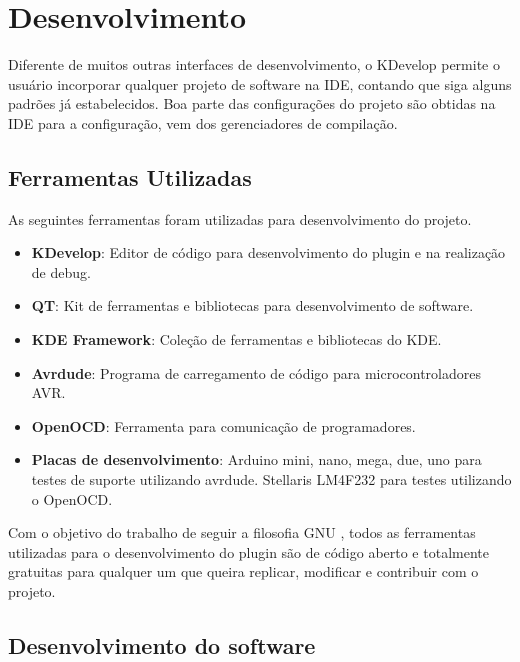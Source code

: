 \chapter{Desenvolvimento}

Diferente de muitos outras interfaces de desenvolvimento, o KDevelop permite o usuário incorporar qualquer projeto de software na IDE,
contando que siga alguns padrões já estabelecidos. Boa parte das configurações do projeto são obtidas na IDE para a configuração, vem dos gerenciadores de compilação.

\section{Ferramentas Utilizadas}
As seguintes ferramentas foram utilizadas para desenvolvimento do projeto.
\begin{itemize}
 \item \textbf{KDevelop}: Editor de código para desenvolvimento do plugin e na realização de debug.
 \item \textbf{QT}: Kit de ferramentas e bibliotecas para desenvolvimento de software.
 \item \textbf{KDE Framework}: Coleção de ferramentas e bibliotecas do KDE.
 \item \textbf{Avrdude}: Programa de carregamento de código para microcontroladores AVR.
 \item \textbf{OpenOCD}: Ferramenta para comunicação de programadores.
 \item \textbf{Placas de desenvolvimento}: Arduino mini, nano, mega, due, uno para testes de suporte utilizando avrdude. Stellaris LM4F232 para testes utilizando o OpenOCD.
\end{itemize}

Com o objetivo do trabalho de seguir a filosofia GNU \cite{filosofia}, todos as ferramentas utilizadas para o desenvolvimento do plugin são de código aberto e totalmente gratuitas para qualquer um que queira replicar, modificar e contribuir com o projeto.

\section{Desenvolvimento do software}

